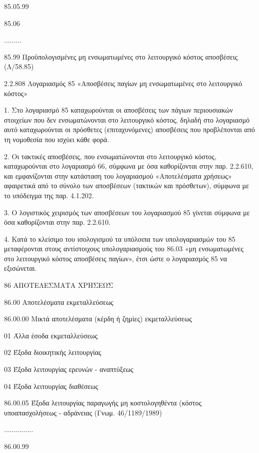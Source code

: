 \documentclass[A4,10pt,greek]{book}
\begin{document}
                    85.05.99

        85.06

         .........

         85.99    Προϋπολογισμένες μη ενσωματωμένες στο λειτουργικό κόστος
                      αποσβέσεις (Λ/58.85)

2.2.808 Λογαριασμός 85 «Αποσβέσεις παγίων μη ενσωματωμένες στο λειτουργικό κόστος»

1. Στο λογαριασμό 85 καταχωρούνται οι αποσβέσεις των πάγιων περιουσιακών στοιχείων που δεν ενσωματώνονται στο λειτουργικό κόστος, δηλαδή στο λογαριασμό αυτό καταχωρούνται οι πρόσθετες (επιταχυνόμενες) αποσβέσεις που προβλέπονται από τη νομοθεσία που ισχύει κάθε φορά.

2. Οι τακτικές αποσβέσεις, που ενσωματώνονται στο λειτουργικό κόστος, καταχωρούνται στο λογαριασμό 66, σύμφωνα με όσα καθορίζονται στην παρ. 2.2.610, και εμφανίζονται στην κατάσταση του λογαριασμού «Αποτελέσματα χρήσεως» αφαιρετικά από το σύνολο των αποσβέσεων (τακτικών και πρόσθετων), σύμφωνα με το υπόδειγμα της παρ. 4.1.202.

3. Ο λογιστικός χειρισμός των αποσβέσεων του λογαριασμού 85 γίνεται σύμφωνα με όσα καθορίζονται στην παρ. 2.2.610.

4. Κατά το κλείσιμο του ισολογισμού τα υπόλοιπα των υπολογαριασμών του 85 μεταφέρονται στους αντίστοιχους υπολογαριασμούς του 86.03 «μη ενσωματωμένες στο λειτουργικό κόστος αποσβέσεις παγίων», έτσι ώστε ο λογαριασμός 85 να εξισώνεται.

 86    ΑΠΟΤΕΛΕΣΜΑΤΑ ΧΡΗΣΕΩΣ

        86.00    Αποτελέσματα εκμεταλλεύσεως

                     86.00.00    Μικτά αποτελέσματα (κέρδη ή ζημίες) εκμεταλλεύσεως

                               01    Άλλα έσοδα εκμεταλλεύσεως

                               02    Έξοδα διοικητικής λειτουργίας

                               03    Έξοδα λειτουργίας ερευνών - αναπτύξεως

                               04    Έξοδα λειτουργίας διαθέσεως

                     86.00.05    Έξοδα λειτουργίας παραγωγής μη κοστολογηθέντα (κόστος
                                       υποαπασχολήσεως - αδράνειας (Γνωμ. 46/1189/1989)

                     ...............

                     86.00.99
\end{document}
